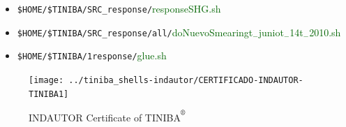 \documentclass[12pt,leqno]{article}
\def\reg{\textsuperscript{\textregistered}}
\numberwithin{equation}{section}
\begin{document}
\begin{enumerate}
   
\begin{itemize}
\item \verb=$HOME/$TINIBA/SRC_response/=\textcolor{darkgreen}{responseSHG.sh} 
\item \verb=$HOME/$TINIBA/SRC_response/all/=\textcolor{darkgreen}{doNuevoSmearingt$_{-}$juniot$_{-}$14t$_{-}$2010.sh} 
\item \verb=$HOME/$TINIBA/1response/=\textcolor{darkgreen}{glue.sh} 
\end{itemize}

\end{enumerate}

\begin{figure}[t]
\begin{center}
\texttt{[image: ../tiniba\_shells-indautor/CERTIFICADO-INDAUTOR-TINIBA1]}
\end{center}
\caption{INDAUTOR Certificate of TINIBA$^{\reg}$ 
}
\label{inpi}
\end{figure}
\end{document}
